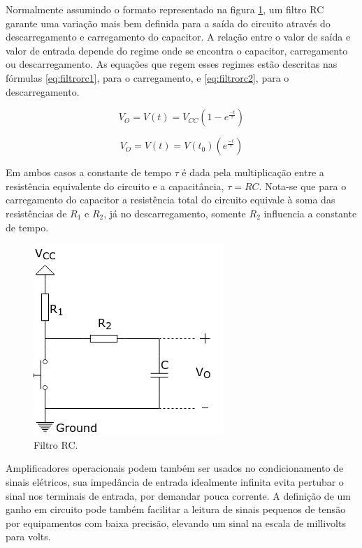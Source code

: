 Normalmente assumindo o formato representado na figura \ref{fig:filtrorc},
um filtro RC garante uma variação mais bem definida para a saída do 
circuito através do descarregamento e carregamento do capacitor. 
A relação entre o valor de saída e valor de entrada depende do regime
onde se encontra o capacitor, carregamento ou descarregamento. 
As equações que regem esses regimes estão descritas nas fórmulas 
\ref{eq:filtrorc1}, para o carregamento, e \ref{eq:filtrorc2}, para o descarregamento.

\begin{equation}
    \label{eq:filtrorc1}
    V_O = V(t) = V_{CC}\left(1-e^{\frac{-t}{\tau}}\right)
\end{equation}

\begin{equation}
    \label{eq:filtrorc2}
    V_O = V(t) = V(t_0)\left(e^{\frac{-t}{\tau}}\right)
\end{equation}

Em ambos casos a constante de tempo $\tau$ é dada pela multiplicação 
entre a resistência equivalente do circuito e a capacitância, $\tau = RC$.
Nota-se que para o carregamento do capacitor a resistência total do
circuito equivale à soma das resistências de $R_1$ e $R_2$, já no 
descarregamento, somente $R_2$ influencia a constante de tempo. 

\begin{figure}[h]
    \caption{Filtro RC.}    
    
    \begin{centering}
        \includegraphics[width=0.3\columnwidth]{images/fundamentos/RCFilter.png}
    \par\end{centering}

    \label{fig:filtrorc}
\end{figure}

Amplificadores operacionais podem também ser usados no condicionamento
de sinais elétricos, sua impedância de entrada idealmente infinita 
evita pertubar o sinal nos terminais de entrada, por demandar pouca 
corrente.
A definição de um ganho em circuito pode também facilitar a leitura 
de sinais pequenos de tensão por equipamentos com baixa precisão, 
elevando um sinal na escala de millivolts para volts.

